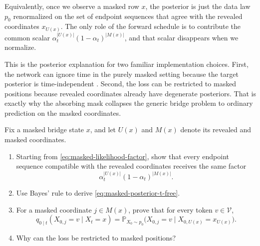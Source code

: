 \documentclass[11pt]{article}
\newif\ifshowsolutions
\newcommand{\SolutionBox}[2][10]{%
  \ifshowsolutions
    \begin{tcolorbox}[stat221panelgray,title={Solution}]
    #2
    \end{tcolorbox}
  \else
    \begin{tcolorbox}[stat221panelgray,unbreakable,title={Workspace}]
    \vspace{#1\baselineskip}
    \end{tcolorbox}
  \fi
}
\begin{document}
Equivalently, once we observe a masked row \(x\), the posterior is just the data law \(p_0\) renormalized on the set of endpoint sequences that agree with the revealed coordinates \(x_{U(x)}\).
The only role of the forward schedule is to contribute the common scalar \(\alpha_t^{|U(x)|}(1-\alpha_t)^{|M(x)|}\), and that scalar disappears when we normalize.

This is the posterior explanation for two familiar implementation choices.
First, the network can ignore time in the purely masked setting because the target posterior is time-independent \citep[Prop.~6 and App.~E.8]{gat2024discrete}.
Second, the loss can be restricted to masked positions because revealed coordinates already have degenerate posteriors.
That is exactly why the absorbing mask collapses the generic bridge problem to ordinary prediction on the masked coordinates.

\begin{exercise}
\label{ex:masked-cancel}
Fix a masked bridge state \(x\), and let \(U(x)\) and \(M(x)\) denote its revealed and masked coordinates.
\begin{enumerate}[leftmargin=*]
  \item Starting from \eqref{eq:masked-likelihood-factor}, show that every endpoint sequence compatible with the revealed coordinates receives the same factor
  \[
    \alpha_t^{|U(x)|}(1-\alpha_t)^{|M(x)|}.
  \]
  \item Use Bayes' rule to derive \eqref{eq:masked-posterior-t-free}.
  \item For a masked coordinate \(j\in M(x)\), prove that for every token \(v\in\mathcal{V}\),
  \[
    q_{0\mid t}(X_{0,j}=v\mid X_t=x)
    =
    \mathbb{P}_{X_0\sim p_0}\bigl(X_{0,j}=v \mid X_{0,U(x)}=x_{U(x)}\bigr).
  \]
  \item Why can the loss be restricted to masked positions?
\end{enumerate}
\end{exercise}
\SolutionBox[14]{By \eqref{eq:masked-likelihood-factor},
\[
  K_{t\mid 0}(x\mid x_0)
  =
  \alpha_t^{|U(x)|}(1-\alpha_t)^{|M(x)|}
  \prod_{i\in U(x)}\mathbf{1}\{x_{0,i}=x_i\}.
\]
So every endpoint sequence \(x_0\) compatible with the revealed coordinates gets the same schedule-dependent factor, and every incompatible sequence gets likelihood zero.
Bayes' rule gives
\[
  q_{0\mid t}(x_0\mid x)
  \propto
  p_0(x_0)\,
  \alpha_t^{|U(x)|}(1-\alpha_t)^{|M(x)|}
  \prod_{i\in U(x)}\mathbf{1}\{x_{0,i}=x_i\}.
\]
The schedule factor does not depend on \(x_0\), so it cancels during normalization:
\[
  q_{0\mid t}(x_0\mid x)
  \propto
  p_0(x_0)\prod_{i\in U(x)}\mathbf{1}\{x_{0,i}=x_i\}.
\]
Therefore, for \(j\in M(x)\),
\[
  q_{0\mid t}(X_{0,j}=v\mid X_t=x)
  =
  \mathbb{P}_{X_0\sim p_0}\bigl(X_{0,j}=v \mid X_{0,U(x)}=x_{U(x)}\bigr).
\]
Revealed positions can be dropped from the loss because their posteriors are already point masses by \Cref{cor:masked-revealed}; only the masked coordinates still carry uncertainty.}
\end{document}
